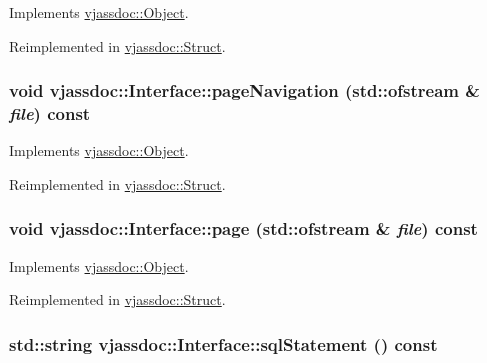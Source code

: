 Implements \hyperlink{classvjassdoc_1_1Object_bd43e77dbe80055f5adda67661dfaca4}{vjassdoc::Object}.

Reimplemented in \hyperlink{classvjassdoc_1_1Struct_39dc86da31e526f3a6eb3b6e442156bb}{vjassdoc::Struct}.\hypertarget{classvjassdoc_1_1Interface_f0acc07a23eb46eb9f065fb47d55f1a5}{
\subsubsection{\setlength{\rightskip}{0pt plus 5cm}void vjassdoc::Interface::pageNavigation (std::ofstream \& {\em file}) const}}
\label{classvjassdoc_1_1Interface_f0acc07a23eb46eb9f065fb47d55f1a5}




Implements \hyperlink{classvjassdoc_1_1Object_736bbb6719edd8070d8f56c364a2764c}{vjassdoc::Object}.

Reimplemented in \hyperlink{classvjassdoc_1_1Struct_c415c5b26f7385a990339dfbfbbca5dc}{vjassdoc::Struct}.\hypertarget{classvjassdoc_1_1Interface_79ed4ee7fd055e3b53fdb9b14749fa0f}{
\subsubsection{\setlength{\rightskip}{0pt plus 5cm}void vjassdoc::Interface::page (std::ofstream \& {\em file}) const}}
\label{classvjassdoc_1_1Interface_79ed4ee7fd055e3b53fdb9b14749fa0f}




Implements \hyperlink{classvjassdoc_1_1Object_a0489e38956f3507566b1bc6e3e2c8af}{vjassdoc::Object}.

Reimplemented in \hyperlink{classvjassdoc_1_1Struct_bd918c5a1ec7defe1849f4b4e61523f2}{vjassdoc::Struct}.\hypertarget{classvjassdoc_1_1Interface_93fbe7323df0502111e576c08376b726}{
\subsubsection{\setlength{\rightskip}{0pt plus 5cm}std::string vjassdoc::Interface::sqlStatement () const}}
\label{classvjassdoc_1_1Interface_93fbe7323df0502111e576c08376b726}




